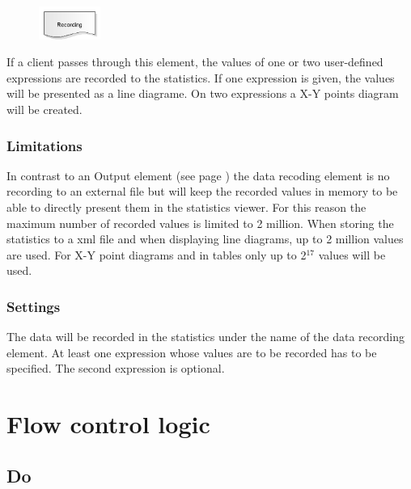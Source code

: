 \begin{figure}
\vspace{-22pt}
\includegraphics[width=2cm]{imageModelElementRecord.png}
\vspace{-22pt}
\end{figure}

If a client passes through this element, the values of one or two user-defined expressions
are recorded to the statistics. If one expression is given, the values will be presented
as a line diagrame. On two expressions a X-Y points diagram will be created.

\subsection*{Limitations}

In contrast to an Output element (see page \pageref{ref:ModelElementOutput}) the data recoding element
is no recording to an external file but will keep the recorded values in memory to be able to
directly present them in the statistics viewer. For this reason the maximum number of recorded
values is limited to 2 million. When storing the statistics to a xml file and when displaying
line diagrams, up to 2 million values are used. For X-Y point diagrams and in tables only up to
2$^{17}$ values will be used.

\subsection*{Settings}

The data will be recorded in the statistics under the name of the data recording element. 
At least one expression whose values are to be recorded has to be specified.
The second expression is optional.





\chapter{Flow control logic}

\section{Do}
\label{ref:ModelElementLogicDo}

